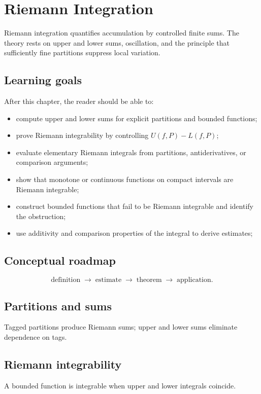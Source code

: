 \chapter{Riemann Integration}
\label{ch:ii10}

Riemann integration quantifies accumulation by controlled finite sums. The theory rests on upper and lower sums, oscillation, and the principle that sufficiently fine partitions suppress local variation.

\section*{Learning goals}
After this chapter, the reader should be able to:
\begin{itemize}
\item compute upper and lower sums for explicit partitions and bounded functions;
\item prove Riemann integrability by controlling \(U(f,P)-L(f,P)\);
\item evaluate elementary Riemann integrals from partitions, antiderivatives, or comparison arguments;
\item show that monotone or continuous functions on compact intervals are Riemann integrable;
\item construct bounded functions that fail to be Riemann integrable and identify the obstruction;
\item use additivity and comparison properties of the integral to derive estimates;
\end{itemize}
\section*{Conceptual roadmap}
\[
\boxed{\text{definition}\;\longrightarrow\;\text{estimate}\;\longrightarrow\;\text{theorem}\;\longrightarrow\;\text{application}.}
\]

\section{Partitions and sums}
Tagged partitions produce Riemann sums; upper and lower sums eliminate dependence on tags.

\section{Riemann integrability}
A bounded function is integrable when upper and lower integrals coincide.

